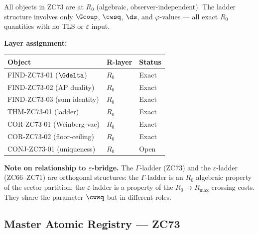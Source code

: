 \documentclass[12pt, a4paper]{article}
\begin{document}
\begin{layerbox}[title={R-Layer Assignments for ZC73}]
All objects in ZC73 are at $R_0$ (algebraic,
observer-independent). The ladder structure involves only
$\Gcoup$, $\cwsq$, $\ds$, and $\varphi$-values --- all
exact $R_0$ quantities with no TLS or $\varepsilon$ input.

\textbf{Layer assignment:}
\begin{center}
{\small\renewcommand{\arraystretch}{1.25}
\begin{tabular}{@{}lll@{}}
\toprule
Object & R-layer & Status \\
\midrule
FIND-ZC73-01 ($\Gdelta$)  & $R_0$ & Exact \\
FIND-ZC73-02 (AP duality) & $R_0$ & Exact \\
FIND-ZC73-03 (sum identity)& $R_0$ & Exact \\
THM-ZC73-01 (ladder)       & $R_0$ & Exact \\
COR-ZC73-01 (Weinberg-vac) & $R_0$ & Exact \\
COR-ZC73-02 (floor-ceiling) & $R_0$ & Exact \\
CONJ-ZC73-01 (uniqueness)  & $R_0$ & Open \\
\bottomrule
\end{tabular}
}
\end{center}

\textbf{Note on relationship to $\varepsilon$-bridge.}
The $\Gamma$-ladder (ZC73) and the $\varepsilon$-ladder
(ZC66--ZC71) are orthogonal structures:
the $\Gamma$-ladder is an $R_0$ algebraic property of the
sector partition; the $\varepsilon$-ladder is a property of
the $R_0\to R_{\max}$ crossing costs. They share the
parameter $\cwsq$ but in different roles.
\end{layerbox}

\subsection{Master Atomic Registry --- ZC73}
\label{sec:registry}
\end{document}

